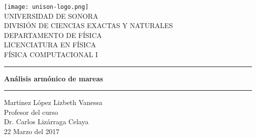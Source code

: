 \documentclass[12pt]{article}
\begin{document}
\begin{center}
\texttt{[image: unison-logo.png]}
\\
\vspace{0.5cm}
UNIVERSIDAD DE SONORA \\
\vspace{0.5cm}
DIVISIÓN DE CIENCIAS EXACTAS Y NATURALES \\
\vspace{0.5cm}
DEPARTAMENTO DE FÍSICA\\
\vspace{0.5cm}
LICENCIATURA EN FÍSICA\\
\vspace{0.5cm}
FÍSICA COMPUTACIONAL I

\vspace{2 cm}
\hrule
\vspace{1 cm}

{\huge \bfseries {Análisis armónico de mareas}}

\vspace{1 cm}
\hrule
\vspace{2 cm}
Martinez López Lizbeth Vanessa \\ 
\vspace{1 cm}
Profesor del curso\\
Dr. Carlos Lizárraga Celaya\\
\vspace{2 cm}
22 Marzo del 2017
\end{center}
\pagebreak
\end{document}
